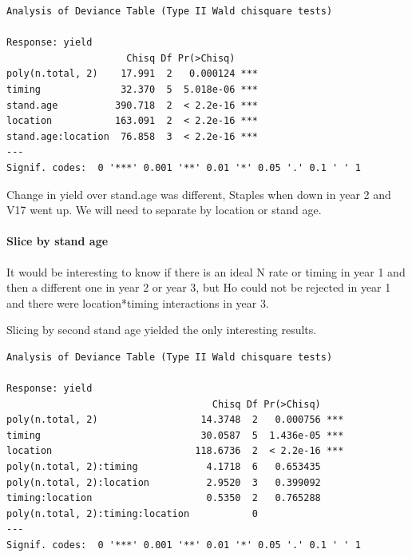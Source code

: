 \documentclass[
  letterpaper,
  DIV=11,
  numbers=noendperiod]{scrartcl}
\let\oldparagraph\paragraph
\renewcommand{\paragraph}[1]{\oldparagraph{#1}\mbox{}}
\begin{document}
\begin{verbatim}
Analysis of Deviance Table (Type II Wald chisquare tests)

Response: yield
                     Chisq Df Pr(>Chisq)    
poly(n.total, 2)    17.991  2   0.000124 ***
timing              32.370  5  5.018e-06 ***
stand.age          390.718  2  < 2.2e-16 ***
location           163.091  2  < 2.2e-16 ***
stand.age:location  76.858  3  < 2.2e-16 ***
---
Signif. codes:  0 '***' 0.001 '**' 0.01 '*' 0.05 '.' 0.1 ' ' 1
\end{verbatim}

Change in yield over stand.age was different, Staples when down in year
2 and V17 went up. We will need to separate by location or stand age.

\hypertarget{slice-by-stand-age}{%
\paragraph{Slice by stand age}\label{slice-by-stand-age}}

It would be interesting to know if there is an ideal N rate or timing in
year 1 and then a different one in year 2 or year 3, but Ho could not be
rejected in year 1 and there were location*timing interactions in year
3.

Slicing by second stand age yielded the only interesting results.

\begin{verbatim}
Analysis of Deviance Table (Type II Wald chisquare tests)

Response: yield
                                    Chisq Df Pr(>Chisq)    
poly(n.total, 2)                  14.3748  2   0.000756 ***
timing                            30.0587  5  1.436e-05 ***
location                         118.6736  2  < 2.2e-16 ***
poly(n.total, 2):timing            4.1718  6   0.653435    
poly(n.total, 2):location          2.9520  3   0.399092    
timing:location                    0.5350  2   0.765288    
poly(n.total, 2):timing:location           0               
---
Signif. codes:  0 '***' 0.001 '**' 0.01 '*' 0.05 '.' 0.1 ' ' 1
\end{verbatim}
\end{document}
